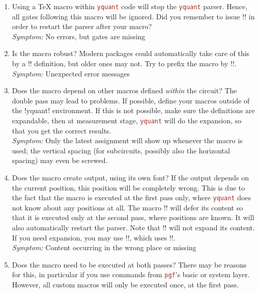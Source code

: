 \documentclass{scrartcl}
\def\pkg#1{\textcolor{brown}{\texttt{#1}}}
\def\Yquant{\pkg{yquant}}
\begin{document}
      \begin{enumerate}
         \item Using a \TeX{} macro within \Yquant{} code will stop the \Yquant{} parser.
            Hence, all gates following this macro will be ignored.
            Did you remember to issue \tex!\yquant! in order to restart the parser after your macro? \\
            \emph{Symptom:} No errors, but gates are missing
         \item Is the macro robust?
            Modern packages could automatically take care of this by a \tex!\protected! definition, but older ones may not.
            Try to prefix the macro by \tex!\protect!. \\
            \emph{Symptom:} Unexpected error messages
         \item Does the macro depend on other macros defined \emph{within} the circuit?
            The double pass may lead to problems.
            If possible, define your macros outside of the \tex!yquant! environment.
            If this is not possible, make sure the definitions are expandable, then at measurement stage, \Yquant{} will do the expansion, so that you get the correct results. \\
            \emph{Symptom:} Only the latest assignment will show up whenever the macro is used; the vertical spacing (for subcircuits, possibly also the horizontal spacing) may even be screwed.
         \item Does the macro create output, using its own font?
            If the output depends on the current position, this position will be completely wrong.
            This is due to the fact that the macro is executed at the first pass only, where \Yquant{} does not know about any positions at all.
            The macro \tex!\yquantsecondpass! will defer its content so that it is executed only at the second pass, where positions are known.
            It will also automatically restart the parser.
            Note that \tex!\yquantsecondpass! will not expand its content.
            If you need expansion, you may use \tex!\yquantesecondpass!, which uses \tex!\protected@edef!. \\
            \emph{Symptom:} Content occurring in the wrong place or missing
         \item Does the macro need to be executed at both passes?
            There may be reasons for this, in particular if you use commands from \pkg{pgf}'s basic or system layer.
            However, all custom macros will only be executed once, at the first pass.

\end{enumerate}
\end{document}
